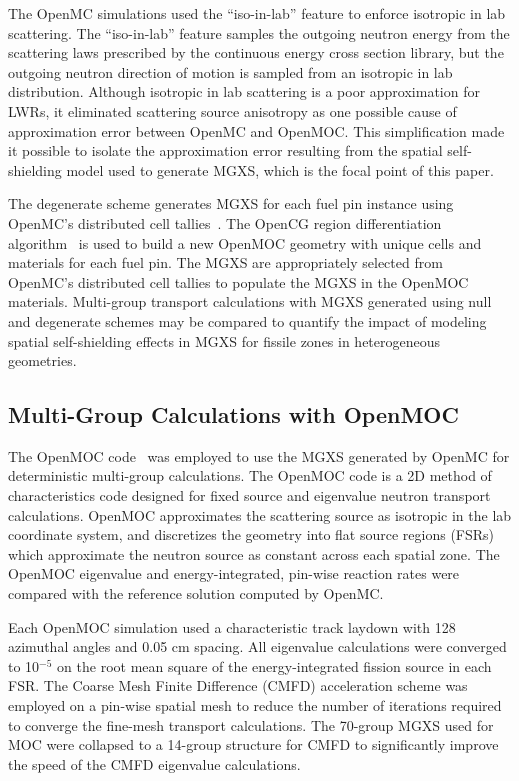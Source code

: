 The OpenMC simulations used the ``iso-in-lab'' feature to enforce isotropic in lab scattering. The ``iso-in-lab'' feature samples the outgoing neutron energy from the scattering laws prescribed by the continuous energy cross section library, but the outgoing neutron direction of motion is sampled from an isotropic in lab distribution. Although isotropic in lab scattering is a poor approximation for LWRs, it eliminated scattering source anisotropy as one possible cause of approximation error between OpenMC and OpenMOC. This simplification made it possible to isolate the approximation error resulting from the spatial self-shielding model used to generate MGXS, which is the focal point of this paper.

The degenerate scheme generates MGXS for each fuel pin instance using OpenMC's distributed cell tallies~\citep{lax2014distribcell}. The OpenCG region differentiation algorithm~\citep{boyd2015opencg} is used to build a new OpenMOC geometry with unique cells and materials for each fuel pin. The MGXS are appropriately selected from OpenMC's distributed cell tallies to populate the MGXS in the OpenMOC materials. Multi-group transport calculations with MGXS generated using null and degenerate schemes may be compared to quantify the impact of modeling spatial self-shielding effects in MGXS for fissile zones in heterogeneous geometries.

\subsection{Multi-Group Calculations with OpenMOC}
\label{subsec:openmoc}

The OpenMOC code~\citep{boyd2014openmoc} was employed to use the MGXS generated by OpenMC for deterministic multi-group calculations. The OpenMOC code is a 2D method of characteristics code designed for fixed source and eigenvalue neutron transport calculations. OpenMOC approximates the scattering source as isotropic in the lab coordinate system, and discretizes the geometry into flat source regions (FSRs) which approximate the neutron source as constant across each spatial zone. The OpenMOC eigenvalue and energy-integrated, pin-wise reaction rates were compared with the reference solution computed by OpenMC.

Each OpenMOC simulation used a characteristic track laydown with 128 azimuthal angles and 0.05 cm spacing. All eigenvalue calculations were converged to 10$^{-5}$ on the root mean square of the energy-integrated fission source in each FSR. The Coarse Mesh Finite Difference (CMFD) acceleration scheme was employed on a pin-wise spatial mesh to reduce the number of iterations required to converge the fine-mesh transport calculations. The 70-group MGXS used for MOC were collapsed to a 14-group structure for CMFD to significantly improve the speed of the CMFD eigenvalue calculations.